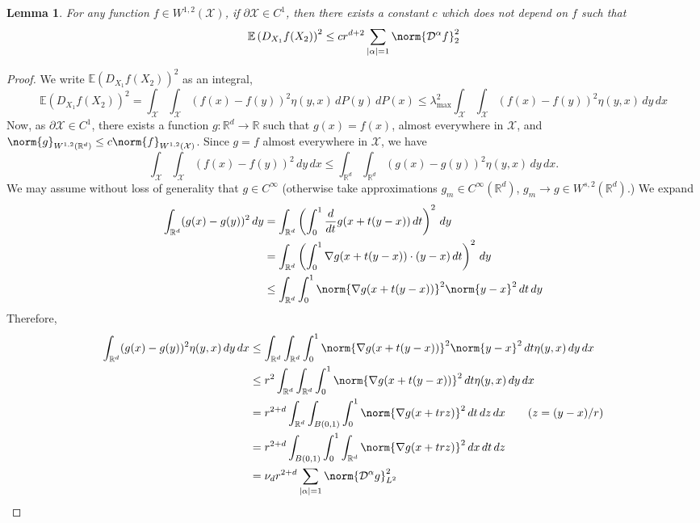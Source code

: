 \documentclass{article}
\newcommand{\Reals}{\mathbb{R}}
\newcommand{\abs}[1]{\left \lvert #1 \right \rvert}
\newcommand{\1}{\mathbf{1}}
\newcommand{\Rd}{\Reals^d}
\newcommand{\domain}{\mathcal{X}}
\newcommand{\Ebb}{\mathbb{E}}
\newcommand{\Partial}{\mathcal{D}}
\theoremstyle{alden}
\theoremstyle{aldenthm}
\newtheorem{lemma}{Lemma}
\theoremstyle{definition}
\theoremstyle{remark}
\begin{document}
\begin{lemma}
	\label{lem:W22_penalty_operator_1}
	For any function $f \in W^{1,2}(\mathcal{X})$, if $\partial \domain \in C^1$, then there exists a constant $c$ which does not depend on $f$ such that
	\begin{equation*}
	\Ebb\left(D_{X_1}f(X_2)\right)^2 \leq c r^{d + 2} \sum_{\abs{\alpha} = 1} \norm{\Partial^{\alpha}f}_2^2
	\end{equation*}
\end{lemma}
\begin{proof}
	We write $\Ebb\left(D_{X_1}f(X_2)\right)^2$ as an integral,
	\begin{equation*}
	\Ebb\left(D_{X_1}f(X_2)\right)^2 = \int_{\domain} \int_{\domain} (f(x) - f(y))^2 \eta(y,x) \,dP(y) \,dP(x) \leq \lambda_{\max}^2 \int_{\domain} \int_{\domain} (f(x) - f(y))^2 \eta(y,x) \,dy \,dx
	\end{equation*}
	Now, as $\partial \domain \in C^{1}$, there exists a function $g:\Rd \to \Reals$ such that $g(x) = f(x)$, almost everywhere in $\domain$, and $\norm{g}_{W^{1,2}(\Rd)} \leq c \norm{f}_{W^{1,2}(\domain)}$.  Since $g = f$ almost everywhere in $\domain$, we have
	\begin{equation}
	\label{eqn:W12_integral_penalty_1}
	\int_{\domain} \int_{\domain} (f(x) - f(y))^2 \,dy \,dx \leq \int_{\Rd} \int_{\Rd} (g(x) - g(y))^2 \eta(y,x) \,dy \,dx.
	\end{equation}
	We may assume without loss of generality that $g \in C^{\infty}$ (otherwise take approximations $g_m \in C^{\infty}(\Rd)$, $g_m  \to g \in W^{s,2}(\Rd)$.) We expand
	\begin{align*}
	\int_{\Rd} (g(x) - g(y))^2 \,dy & = \int_{\Rd} \left( \int_{0}^{1} \frac{d}{dt} g(x + t(y - x)) \,dt \right)^2 \,dy \\
	& = \int_{\Rd} \left( \int_{0}^{1} \nabla g(x + t(y - x)) \cdot (y - x) \,dt \right)^2 \,dy \\
	& \leq \int_{\Rd} \int_{0}^{1} \norm{\nabla g(x + t(y - x))}^2 \norm{y - x}^2 \,dt \,dy
	\end{align*}
	Therefore,
	\begin{align*}
	\int_{\Rd} (g(x) - g(y))^2 \eta(y,x) \,dy \,dx & \leq \int_{\Rd} \int_{\Rd} \int_{0}^{1} \norm{\nabla g(x + t(y - x))}^2 \norm{y - x}^2 \,dt \eta(y,x) \,dy \,dx \\
	& \leq r^2 \int_{\Rd} \int_{\Rd} \int_{0}^{1} \norm{\nabla g(x + t(y - x))}^2 \,dt \eta(y,x) \,dy \,dx \\
	& = r^{2 + d} \int_{\Rd} \int_{B(0,1)} \int_{0}^{1} \norm{\nabla g(x + trz)}^2 \,dt \,dz \,dx  \tag{$z = (y - x)/r$}\\
	& =  r^{2 + d} \int_{B(0,1)} \int_{0}^{1} \int_{\Rd}  \norm{\nabla g(x + trz)}^2 \,dx \,dt \,dz \\
	& = \nu_d r^{2 + d} \sum_{\abs{\alpha} = 1} \norm{\Partial^{\alpha} g}_{L^2}^2 
	\end{align*}
\end{proof}
\end{document}
